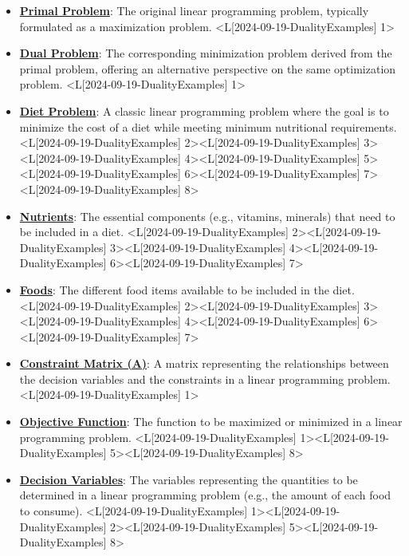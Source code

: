 \documentclass{article}%
\begin{document}
\begin{itemize}[[leftmargin=*]]%
\item \href{https://www.math.purdue.edu/~yipn/421/2024-09-19-DualityExamples.pdf#page=1}{\textbf{Primal Problem}}: The original linear programming problem, typically formulated as a maximization problem. <L[2024-09-19-DualityExamples] 1>%
\item \href{https://www.math.purdue.edu/~yipn/421/2024-09-19-DualityExamples.pdf#page=1}{\textbf{Dual Problem}}: The corresponding minimization problem derived from the primal problem, offering an alternative perspective on the same optimization problem. <L[2024-09-19-DualityExamples] 1>%
\item \href{https://www.math.purdue.edu/~yipn/421/2024-09-19-DualityExamples.pdf#page=2}{\textbf{Diet Problem}}: A classic linear programming problem where the goal is to minimize the cost of a diet while meeting minimum nutritional requirements. <L[2024-09-19-DualityExamples] 2><L[2024-09-19-DualityExamples] 3><L[2024-09-19-DualityExamples] 4><L[2024-09-19-DualityExamples] 5><L[2024-09-19-DualityExamples] 6><L[2024-09-19-DualityExamples] 7><L[2024-09-19-DualityExamples] 8>%
\item \href{https://www.math.purdue.edu/~yipn/421/2024-09-19-DualityExamples.pdf#page=2}{\textbf{Nutrients}}: The essential components (e.g., vitamins, minerals) that need to be included in a diet. <L[2024-09-19-DualityExamples] 2><L[2024-09-19-DualityExamples] 3><L[2024-09-19-DualityExamples] 4><L[2024-09-19-DualityExamples] 6><L[2024-09-19-DualityExamples] 7>%
\item \href{https://www.math.purdue.edu/~yipn/421/2024-09-19-DualityExamples.pdf#page=2}{\textbf{Foods}}: The different food items available to be included in the diet. <L[2024-09-19-DualityExamples] 2><L[2024-09-19-DualityExamples] 3><L[2024-09-19-DualityExamples] 4><L[2024-09-19-DualityExamples] 6><L[2024-09-19-DualityExamples] 7>%
\item \href{https://www.math.purdue.edu/~yipn/421/2024-09-19-DualityExamples.pdf#page=1}{\textbf{Constraint Matrix (A)}}: A matrix representing the relationships between the decision variables and the constraints in a linear programming problem. <L[2024-09-19-DualityExamples] 1>%
\item \href{https://www.math.purdue.edu/~yipn/421/2024-09-19-DualityExamples.pdf#page=1}{\textbf{Objective Function}}: The function to be maximized or minimized in a linear programming problem. <L[2024-09-19-DualityExamples] 1><L[2024-09-19-DualityExamples] 5><L[2024-09-19-DualityExamples] 8>%
\item \href{https://www.math.purdue.edu/~yipn/421/2024-09-19-DualityExamples.pdf#page=1}{\textbf{Decision Variables}}: The variables representing the quantities to be determined in a linear programming problem (e.g., the amount of each food to consume). <L[2024-09-19-DualityExamples] 1><L[2024-09-19-DualityExamples] 2><L[2024-09-19-DualityExamples] 5><L[2024-09-19-DualityExamples] 8>%
\end{itemize}%
\end{document}
